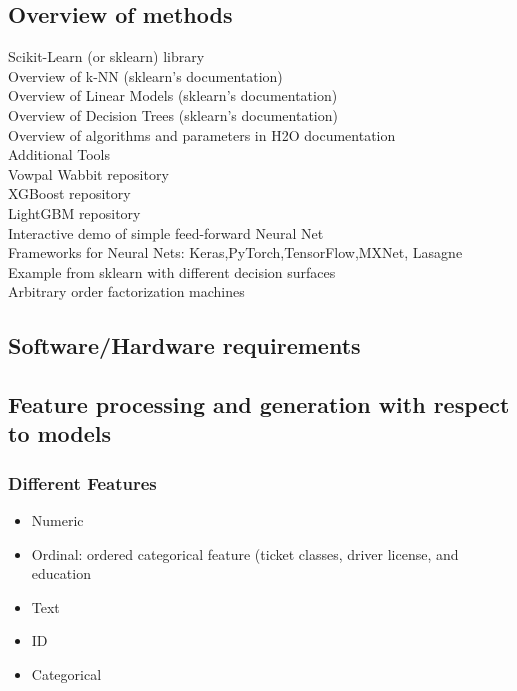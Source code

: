 \documentclass[11pt, twoside]{article}   	%
\begin{document}
\subsection{Overview of methods}
\textup{}Scikit-Learn (or sklearn) library
\\Overview of k-NN (sklearn's documentation)
\\Overview of Linear Models (sklearn's documentation)
\\Overview of Decision Trees (sklearn's documentation)
\\Overview of algorithms and parameters in H2O documentation
\\Additional Tools
\\Vowpal Wabbit repository
\\XGBoost repository
\\LightGBM repository
\\Interactive demo of simple feed-forward Neural Net
\\Frameworks for Neural Nets: Keras,PyTorch,TensorFlow,MXNet, Lasagne
\\Example from sklearn with different decision surfaces
\\Arbitrary order factorization machines

\subsection{Software/Hardware requirements}


\subsection{Feature processing and generation with respect to models}
\subsubsection{Different Features}
\begin{itemize}
  \item Numeric
  \item Ordinal: ordered categorical feature (ticket classes, driver license, and education
  \item Text
  \item ID 
  \item Categorical
\end{itemize}
\end{document}
